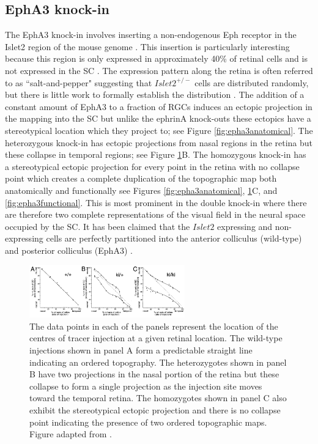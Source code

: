 \subsection{EphA3 knock-in \label{sec:epha3}}
The EphA3 knock-in involves inserting a non-endogenous Eph receptor in the Islet2 region of the mouse genome \cite{Brown2000-da, Reber2004-wq}. This insertion is particularly interesting because this region is only expressed in approximately 40\% of retinal cells and is not expressed in the SC \cite{Brown2000-da}. The expression pattern along the retina is often referred to as ``salt-and-pepper" suggesting that $Islet2^{+/-}$ cells are distributed randomly, but there is little work to formally establish the distribution \cite{Lemke2005-iz}. The addition of a constant amount of EphA3 to a fraction of RGCs induces an ectopic projection in the mapping into the SC but unlike the ephrinA knock-outs these ectopics have a stereotypical location which they project to; see Figure \ref{fig:epha3anatomical}. The heterozygous knock-in has ectopic projections from nasal regions in the retina but these collapse in temporal regions; see Figure \ref{fig:epha3collapse}B. The homozygous knock-in has a stereotypical ectopic projection for every point in the retina with no collapse point which creates a complete duplication of the topographic map both anatomically and functionally see Figures \ref{fig:epha3anatomical}, \ref{fig:epha3collapse}C, and \ref{fig:epha3functional}. This is most prominent in the double knock-in where there are therefore two complete representations of the visual field in the neural space occupied by the SC. It has been claimed that the $Islet2$ expressing and non-expressing cells are perfectly partitioned into the anterior colliculus (wild-type) and posterior colliculus (EphA3) \cite{Cang2013-dw}. 

\begin{figure}[h!]
	\centering
	\includegraphics[width = 0.6\textwidth]{images/introduction/brownEphA3}
	\def\c{Bulk anatomical tracer experiments on the EphA3 knock-in mutant.}
	\caption[\c]{\label{fig:epha3collapse} The data points in each of the panels represent the location of the centres of tracer injection at a given retinal location.  The wild-type injections shown in panel A form a predictable straight line indicating an ordered topography. The heterozygotes shown in panel B have two projections in the nasal portion of the retina but these collapse to form a single projection as the injection site moves toward the temporal retina. The homozygotes shown in panel C also exhibit the stereotypical ectopic projection and there is no collapse point indicating the presence of two ordered topographic maps.  Figure adapted from \cite{Brown2000-da}.}
\end{figure}


